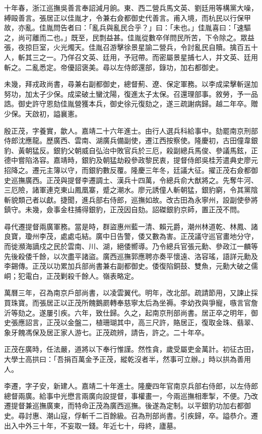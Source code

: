\begin{pinyinscope}
十年春，浙江巡撫吳善言奉詔減月餉。東、西二營兵馬文英、劉廷用等構黨大噪，縛毆善言。張居正以佳胤才，令兼右僉都御史代善言。甫入境，而杭民以行保甲故，亦亂。佳胤問告者曰：「亂兵與亂民合乎？」曰：「未也。」佳胤喜曰：「速驅之，尚可離而二也。」既至，民剽益甚。佳胤從數卒佯問民所苦，下令除之。眾益張，夜掠巨室，火光燭天。佳胤召游擊徐景星諭二營兵，令討亂民自贖。擒百五十人，斬其三之一。乃佯召文英、廷用，予冠帶。而密屬景星捕七人，并文英、廷用斬之。二亂悉定。帝優詔褒美。尋以左侍郎還部，錄功，加右都御史。

未幾，拜戎政尚書，尋兼右副都御史，總督薊、遼、保定軍務。以李成梁擊斬逞加努功，加太子少保。成梁破土蠻沈陽，復進太子太保。召還理部事。敘勞，予一品誥。御史許守恩劾佳胤營獲本兵，御史徐元復劾之，遂三疏謝病歸。越二年卒。贈少保。天啟初，謚襄憲。

殷正茂，字養實，歙人。嘉靖二十六年進士。由行人選兵科給事中。劾罷南京刑部侍郎沈應龍。歷廣西、雲南、湖廣兵備副使，遷江西按察使。隆慶初，古田僮韋銀豹、黃朝猛反。銀豹父朝威自弘治中敗官兵於三厄，殺副總兵馬俊、參議馬鉉，正德中嘗陷洛容。嘉靖時，銀豹及朝猛劫殺參政黎民衷，提督侍郎吳桂芳遣典史廖元招降之。遷元主簿以守，而銀豹數反覆。隆慶三年冬，廷議大征。擢正茂右僉都御史巡撫廣西。正茂與提督李遷調土、漢兵十四萬，令總兵俞大猷將之。先奪牛河、三厄險，諸軍連克東山鳳凰寨，蹙之潮水。廖元誘僮人斬朝猛，銀豹窮，令其黨陰斬貌類己者以獻。捷聞，進兵部右侍郎，巡撫如故。改古田為永寧州，設副使參將鎮守。未幾，僉事金柱捕得銀豹，正茂因自劾。詔磔銀豹京師，置正茂不問。

尋代遷提督兩廣軍務。當是時，群盜惠州藍一清、賴元爵，潮州林道乾、林鳳、諸良寶，瓊州李茂，處處屯結。廣中日告警，倭又數為害。正茂議守巡官畫地分守，而徙瀕海謫戍之民於雲南、川、湖，絕倭嚮導。乃令總兵官張元勳、參政江一麟等先後殺倭千餘，以次盡平諸盜。廣西巡撫郭應聘亦奏平懷遠、洛容瑤，語詳元勳及李錫傳。正茂以功累加兵部尚書兼右副都御史。倭復陷銅鼓、雙魚，元勳大破之儒峒；犯電白，正茂剿殺千餘人。嶺表略定。

萬曆三年，召為南京戶部尚書，以凌雲翼代。明年，改北部。疏請節用，又諫止採買珠寶。而張居正以正茂所餽鵝罽轉奉慈寧太后為坐褥。李幼孜與爭寵，嗾言官詹沂等劾之。遂屢引疾。六年，致仕歸。久之，起南京刑部尚書。居正卒之明年，御史張應詔言，正茂以金盤二，植珊瑚其中，高三尺許，賂居正，復取金珠、翡翠、象牙餽馮保及居正家人游七。正茂疏辨，請告，許之。二十年卒。

正茂在廣時，任法嚴，道將以下奉行惟謹。然性貪，歲受屬吏金萬計。初征古田，大學士高拱曰：「吾捐百萬金予正茂，縱乾沒者半，然事可立辦。」時以拱為善用人。

李遷，字子安，新建人。嘉靖二十年進士。隆慶四年官南京兵部右侍郎，以左侍郎總督兩廣。給事中光懋言兩廣向設提督，事權畫一，今兩巡撫相牽掣，不便。乃改遷提督兼巡撫廣東，而特命正茂為廣西巡撫。後遂為定制。以平銀豹功加右都御史。尋討惠、潮山寇，俘斬千二百餘級。召為刑部尚書。引疾歸，卒。謚恭介。遷出入中外三十年，不妄取一錢。年近七十，母終，廬墓。


\end{pinyinscope}
